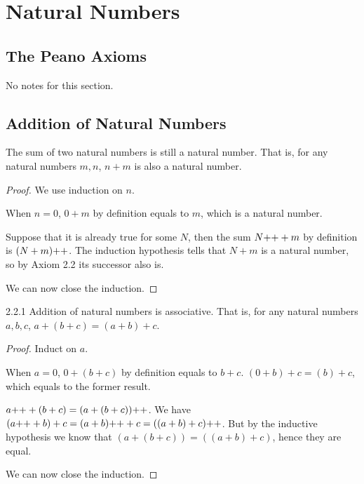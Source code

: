 
\setcounter{chapter}{1}
\chapter{Natural Numbers}
\section{The Peano Axioms}
No notes for this section.

\section{Addition of Natural Numbers}
\begin{why}{20}
The sum of two natural numbers is still a natural number. That is, for any natural numbers $m,n$, $n+m$ is also a natural number.
\end{why}
\begin{proof}
We use induction on $n$. 

 When $n = 0$, $0 + m$ by definition equals to $m$, which is a natural number.

 Suppose that it is already true for some $N$, then the sum $N{+}{+} + m$ by definition is $(N+m){+}{+}$. The induction hypothesis tells that $N+m$ is a natural number, so by Axiom 2.2 its successor also is.

We can now close the induction.
\end{proof}

\begin{exercise}{2.2.1}
Addition of natural numbers is associative. That is, for any natural numbers $a,b,c$, $a+(b+c) = (a+b)+c$.	
\end{exercise}
\begin{proof}
Induct on $a$.

 When $a = 0$, $0 + (b+c)$ by definition equals to $b+c$. $(0+b)+c = (b)+c$, which equals to the former result. 

 $a{+}{+}+(b+c) = (a+(b+c)){+}{+}$. We have $(a{+}{+}+b)+c = (a+b){+}{+}+c = ((a+b)+c){+}{+}$. But by the inductive hypothesis we know that $(a+(b+c)) = ((a+b)+c)$, hence they are equal.

We can now close the induction.
\end{proof}

